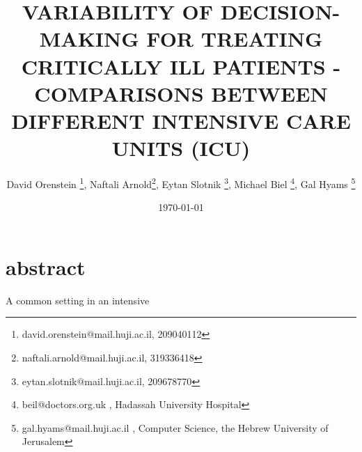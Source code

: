 \documentclass[12pt]{article}
\title{VARIABILITY OF DECISION-MAKING
FOR TREATING CRITICALLY ILL
PATIENTS - COMPARISONS
BETWEEN DIFFERENT INTENSIVE
CARE UNITS (ICU)}
\author{David Orenstein \footnote{david.orenstein@mail.huji.ac.il, 209040112},
Naftali Arnold\footnote{naftali.arnold@mail.huji.ac.il, 319336418},
Eytan Slotnik \footnote{eytan.slotnik@mail.huji.ac.il, 209678770},
Michael Biel \footnote{beil@doctors.org.uk
, Hadassah University Hospital},
Gal Hyams \footnote{gal.hyams@mail.huji.ac.il
, Computer Science, the Hebrew University of Jerusalem}}
\date{\today}
\begin{document}
\maketitle

\section{abstract}
A common setting in an intensive 

\end{document}
